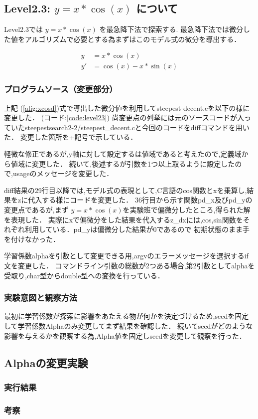 \subsection{Level2.3: $y=x*\cos(x)$ について}
Level2.3では $y=x*\cos(x)$ を最急降下法で探索する.
最急降下法では微分した値をアルゴリズムで必要とする為まずはこのモデル式の微分を導出する．

\begin{align}
    y &= x * \cos(x) \label{alig:cos}\\
    y' &= \cos(x) - x * \sin(x)
    \label{alig:xcosd}
\end{align}


\subsubsection{プログラムソース（変更部分）}

上記 (\ref{alig:xcosd})式で導出した微分値を利用してsteepest-decent.cを以下の様に変更した． (コード:\ref{code:level23})
尚変更点の列挙には元のソースコードが入っていたsteepestsearch2-2/steepest\_decent.cと今回のコードをdiffコマンドを用いた．
変更した箇所を+記号で示している．


軽微な修正であるが,y軸に対して設定するは値域であると考えたので,定義域から値域に変更した．
続いて,後述するが引数を1つ以上取るように設定したので,usageのメッセージを変更した．

diff結果の29行目以降では,モデル式の表現として,C言語のcos関数とxを乗算し,結果をzに代入する様にコードを変更した．
36行目から示す関数pd\_x及びpd\_yの変更点であるが,まず $y=x* \cos(x)$を実験班で偏微分したところ,得られた解を表現した．
実際にxで偏微分をした結果を代入するz\_dxには,cos,sin関数をそれぞれ利用している．pd\_yは偏微分した結果が0であるので
初期状態のまま手を付けなかった．


学習係数alphaを引数として変更できる用,argvのエラーメッセージを選択するif文を変更した．
コマンドライン引数の総数が2つある場合,第2引数としてalphaを受取り,char型からdouble型への変換を行っている．


\subsubsection{実験意図と観察方法}
最初に学習係数が探索に影響をあたえる物が何かを決定づけるため,seedを固定して学習係数Alphaのみ変更してまず結果を確認した．
続いてseedがどのような影響を与えるかを観察する為,Alpha値を固定しseedを変更して観察を行った．

\subsection{Alphaの変更実験}

\subsubsection{実行結果}
\subsubsection{考察}

